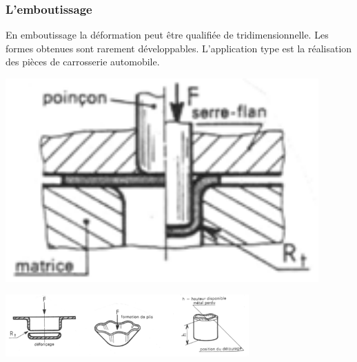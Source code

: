 \documentclass[11pt,oneside]{article}
\begin{document}
\subsubsection{L'emboutissage}

\begin{minipage}[c]{.65\linewidth}
En emboutissage la déformation peut être qualifiée de tridimensionnelle. Les formes obtenues sont rarement développables. L'application type est la réalisation des pièces de carrosserie automobile.

\end{minipage}\hfill
\begin{minipage}[c]{.3\linewidth}
\begin{center}
\includegraphics[width=0.9\textwidth]{png/emboutissage1}
\end{center}
\end{minipage}

\begin{center}
\includegraphics[width=0.7\textwidth]{png/emboutissage2}
\end{center}
\end{document}
